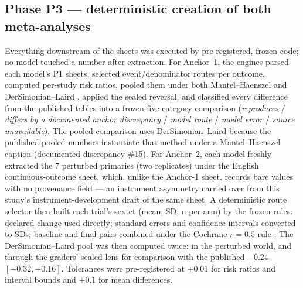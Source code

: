 \documentclass[11pt]{article}
\begin{document}
\subsection{Phase P3 --- deterministic creation of both meta-analyses}
Everything downstream of the sheets was executed by pre-registered, frozen code; no model touched a number after extraction. For Anchor~1, the engines parsed each model's P1 sheets, selected event/denominator routes per outcome, computed per-study risk ratios, pooled them under both Mantel--Haenszel and DerSimonian--Laird \citep{dersimonian1986meta}, applied the sealed reversal, and classified every difference from the published tables into a frozen five-category comparison (\emph{reproduces} / \emph{differs by a documented anchor discrepancy} / \emph{model route} / \emph{model error} / \emph{source unavailable}). The pooled comparison uses DerSimonian--Laird because the published pooled numbers instantiate that method under a Mantel--Haenszel caption (documented discrepancy \#15). For Anchor~2, each model freshly extracted the 7 perturbed primaries (two replicates) under the English continuous-outcome sheet, which, unlike the Anchor-1 sheet, records bare values with no provenance field --- an instrument asymmetry carried over from this study's instrument-development draft of the same sheet. A deterministic route selector then built each trial's sextet (mean, SD, n per arm) by the frozen rules: declared change used directly; standard errors and confidence intervals converted to SDs; baseline-and-final pairs combined under the Cochrane $r=0.5$ rule \citep{higgins2023handbook}. The DerSimonian--Laird pool was then computed twice: in the perturbed world, and through the graders' sealed lens for comparison with the published $-0.24$ $[-0.32, -0.16]$. Tolerances were pre-registered at $\pm0.01$ for risk ratios and interval bounds and $\pm0.1$ for mean differences.
\end{document}
